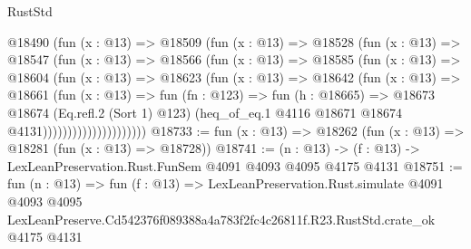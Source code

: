 \begin{lexlean}{RustStd}
\begin{coremodule}
                      @18490
                        (fun (x : @13) =>
                        @18509
                          (fun (x : @13) =>
                          @18528
                            (fun (x : @13) =>
                            @18547
                              (fun (x : @13) =>
                              @18566
                                (fun (x : @13) =>
                                @18585
                                  (fun (x : @13) =>
                                  @18604
                                    (fun (x : @13) =>
                                    @18623
                                      (fun (x : @13) =>
                                      @18642
                                        (fun (x : @13) =>
                                        @18661
                                          (fun (x : @13) =>
                                          fun (fn : @123) =>
                                          fun (h : @18665) =>
                                          @18673
                                            @18674
                                            (Eq.refl.{2} (Sort 1) @123)
                                            (heq_of_eq.{1}
                                              @4116
                                              @18671
                                              @18674
                                              @4131)))))))))))))))))))))
@18733 := fun (x : @13) => @18262 (fun (x : @13) => @18281 (fun (x : @13) => @18728))
@18741 := (n : @13) -> (f : @13) -> LexLeanPreservation.Rust.FunSem @4091 @4093 @4095 @4175 @4131
@18751 := fun (n : @13) =>
  fun (f : @13) =>
  LexLeanPreservation.Rust.simulate
    @4091
    @4093
    @4095
    LexLeanPreserve.Cd542376f089388a4a783f2fc4c26811f.R23.RustStd.crate_ok
    @4175
    @4131
\end{coremodule}
\end{lexlean}
